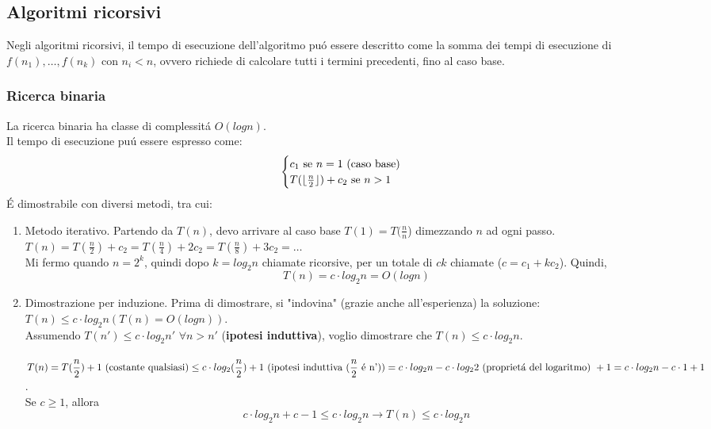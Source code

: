 \documentclass{article}
\DeclarePairedDelimiter\floor{\lfloor}{\rfloor}
\begin{document}
\subsection{Algoritmi ricorsivi}
Negli algoritmi ricorsivi, il tempo di esecuzione dell'algoritmo puó essere descritto come la somma dei tempi di esecuzione di $f(n_1), \dots , f(n_k)$ con $n_i < n$, ovvero richiede di calcolare tutti i termini precedenti, fino al caso base.

\subsubsection{Ricerca binaria}
La ricerca binaria ha classe di complessitá $O(logn)$.\\
Il tempo di esecuzione puú essere espresso come:
\begin{equation}
	\begin{cases}
		c_1 \mbox{ se } n = 1 \mbox{ (caso base)} \\
		T(\floor{\frac{n}{2} }) 
		+ c_2 \mbox{ se } n > 1
	\end{cases}
\end{equation}
É dimostrabile con diversi metodi, tra cui:
\begin{enumerate}
	\item Metodo iterativo. Partendo da $\displaystyle T(n)$, devo arrivare al caso base $T(1) = T(\frac{n}{n}$) dimezzando $n$ ad ogni passo. $T(n) = T(\frac{n}{2}) + c_2 = T(\frac{n}{4}) + 2c_2 = T(\frac{n}{8}) + 3c_2 = \dots$\\
	Mi fermo quando $n = 2^k$, quindi dopo $k = log_2{n}$ chiamate ricorsive, per un totale di $ck$ chiamate ($c = c_1 + kc_2$). Quindi, $$T(n) = c \cdot log_2{n} = O(logn)$$
	\item Dimostrazione per induzione. Prima di dimostrare, si "indovina" (grazie anche all'esperienza) la soluzione: $T(n) \le c \cdot log_2{n} (T(n) = O(logn))$.\\
	Assumendo $T(n') \le c \cdot log_2{n'}$  $\forall n > n'$ (\textbf{ipotesi induttiva}), voglio dimostrare che $T(n) \le c \cdot log_2{n}$.\\\\
	$\displaystyle T(n) = T(\frac{n}{2}) + 1 \mbox{ (costante qualsiasi)} \le c \cdot log_2(\frac{n}{2}) + 1 \mbox{ (ipotesi induttiva (} \frac{n}{2} \mbox{ é n'))} \\
	= c \cdot log_2{n} - c \cdot log_2{2} \mbox{ (proprietá del logaritmo) } + 1 \\
	= c \cdot log_2{n} - c \cdot 1 + 1$.\\
	Se $c \ge 1$, allora $$c \cdot log_2{n} + c - 1 \le c \cdot log_2{n} \rightarrow T(n) \le c \cdot log_2{n}$$
\end{enumerate}
\end{document}
